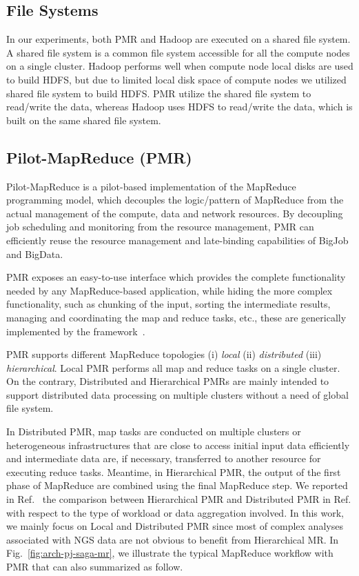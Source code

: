 \documentclass{acm_proc_article-sp}
\begin{document}
\subsection{File Systems}

In our experiments, both PMR and Hadoop are executed on a shared file system.
A shared file system is a common file system accessible for all the compute nodes on a single cluster.
Hadoop performs well when compute node local disks are used to build HDFS, but due to limited local disk space of compute nodes we utilized shared file system to build HDFS. 
PMR utilize the shared file system to read/write the data, whereas Hadoop uses HDFS to read/write the data, which is built on the same shared file system.

\subsection{Pilot-MapReduce (PMR)}

Pilot-MapReduce is a pilot-based implementation of the MapReduce
programming model, which decouples the logic/pattern of MapReduce from
the actual management of the compute, data and network resources. By
decoupling job scheduling and monitoring from the resource management,
PMR can efficiently reuse the resource management and late-binding
capabilities of BigJob and BigData.

PMR exposes an easy-to-use interface which provides the complete
functionality needed by any MapReduce-based application, while hiding
the more complex functionality, such as chunking of the input, sorting
the intermediate results, managing and coordinating the map and reduce
tasks, etc., these are generically implemented by the
framework~\cite{pmr2012}.  

PMR supports different MapReduce topologies (i) \emph{local} (ii)
\emph{distributed} (iii) \emph{hierarchical}. Local PMR performs all
map and reduce tasks on a single cluster.  On the contrary, Distributed and
Hierarchical PMRs are mainly intended to support distributed data
processing  on multiple clusters without a need of global file system.

In Distributed PMR, map tasks are conducted on multiple clusters or heterogeneous infrastructures that are close to access initial input data efficiently and intermediate data are, if necessary, transferred to another resource for executing reduce tasks.  Meantime, in Hierarchical PMR, the
output of the first phase of MapReduce are combined using the final MapReduce
step.  We reported in Ref.~\cite{pmr2012} the comparison between Hierarchical PMR and
Distributed PMR in Ref. with respect to the type of workload or data aggregation involved. In this work, we mainly focus on Local and Distributed PMR since most of complex analyses associated with NGS data are not obvious to benefit from Hierarchical MR.   In Fig.~\ref{fig:arch-pj-saga-mr}, we  illustrate the typical MapReduce workflow with PMR that can also summarized as follow.
\end{document}
